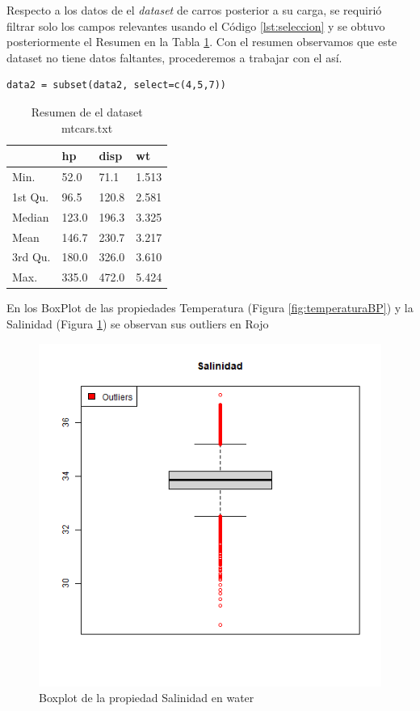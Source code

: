 \documentclass[sigconf]{acmart}
\begin{document}
	Respecto a los datos de el \textit{dataset} de carros posterior a su carga, se requirió filtrar solo los campos relevantes usando el Código \ref{lst:seleccion} y se obtuvo posteriormente el Resumen en la Tabla \ref{tab:Tabla3}. Con el resumen observamos que este dataset no tiene datos faltantes, procederemos a trabajar con el así.
	
	\begin{lstlisting}[caption=Código de seleccion de las propiedades,breaklines,label=lst:seleccion]
		data2 = subset(data2, select=c(4,5,7))
	\end{lstlisting}
	
	\begin{table}
		\begin{tabularx}{\columnwidth}{|X|X|X|X|}
			\hline
			& hp & disp & wt \\
			\hline
			Min.   & 52.0  & 71.1 & 1.513   \\
			\hline
			1st Qu.& 96.5 & 120.8 & 2.581   \\
			\hline
			Median & 123.0 & 196.3 & 3.325    \\
			\hline
			Mean   & 146.7 & 230.7 & 3.217   \\
			\hline
			3rd Qu. & 180.0 & 326.0 & 3.610  \\
			\hline
			Max.  & 335.0 & 472.0 & 5.424  \\
			\hline
		\end{tabularx}
		\caption{\label{tab:Tabla3}Resumen de el dataset mtcars.txt}
	\end{table}
	
	En los BoxPlot de las propiedades Temperatura (Figura \ref{fig:temperaturaBP}) y la Salinidad (Figura \ref{fig:salinidadBP}) se observan sus outliers en Rojo
	
	\begin{figure}
		\centering
		\includegraphics[width=0.7\linewidth]{img/salinidad.png}
		\caption{Boxplot de la propiedad Salinidad en water}
		\label{fig:salinidadBP}
	\end{figure}
	
\end{document}
